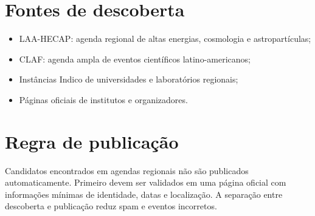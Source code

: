 \section{Fontes de descoberta}

\begin{itemize}[leftmargin=*,itemsep=0.25em]
\item LAA-HECAP: agenda regional de altas energias, cosmologia e astropartículas;
\item CLAF: agenda ampla de eventos científicos latino-americanos;
\item Instâncias Indico de universidades e laboratórios regionais;
\item Páginas oficiais de institutos e organizadores.
\end{itemize}

\section{Regra de publicação}

Candidatos encontrados em agendas regionais não são publicados automaticamente. Primeiro devem ser validados em uma página oficial com informações mínimas de identidade, datas e localização. A separação entre descoberta e publicação reduz spam e eventos incorretos.
